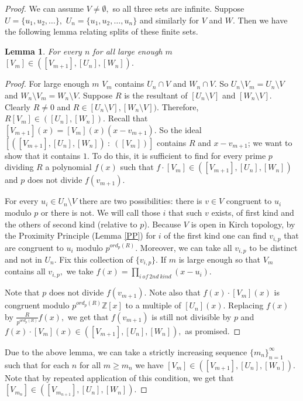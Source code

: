 \documentclass[10pt]{article}
\newtheorem{lemma}[theorem]{Lemma}
\theoremstyle{definition}
\begin{document}
\begin{proof}
We can assume $V \neq \emptyset ,$ so all three sets are infinite. Suppose $U=\{u_1,u_2,\dots \},$ $U_n=\{u_1,u_2,\dots, u_n\}$ and similarly for $V$ and $W$. Then we have the following lemma relating splits of these finite sets.

\begin{lemma} For every $n$ for all large enough $m$ $[V_m] \in ( [V_{m+1}], [U_n], [W_n]).$
\end{lemma}

\begin{proof} For large enough $m$  $V_m$ contains $U_n\cap V$ and $W_n\cap V.$ So $U_n\setminus V_m= U_n\setminus V$ and $W_n\setminus V_m= W_n\setminus V$. Suppose $R$ is the resultant of $[U_n\setminus V]$ and $[W_n\setminus V]$. Clearly $R\neq 0$ and $R\in [U_n\setminus V], [W_n \setminus V]).$ Therefore, $R[V_m] \in ([U_n],[W_n]).$  Recall that $[V_{m+1}](x)=[V_m](x) (x-v_{m+1}).$ So the ideal $[  ( [V_{m+1}], [U_n], [W_n]) \ : \ ([V_m] )]$ contains $R$ and $x-v_{m+1}$; we want to show that it contains $1$. To do this, it is sufficient to find for every prime $p$ dividing $R$ a polynomial $f(x)$ such that $f \cdot [V_m] \in ( [V_{m+1}], [U_n], [W_n])$ and $p$ does not divide $ f(v_{m+1})$.

For every $u_i\in U_n\setminus V$ there are two possibilities: there is $v\in V$ congruent to $u_i$ modulo $p$ or there is not. We will call those $i$ that such $v$ exists, of first kind and the others of second kind (relative to $p$). Because $V$ is open in Kirch topology, by the Proximity Principle (Lemma \ref{PP}) for $i$ of the first kind one can find $v_{i,p}$ that are congruent to $u_i$ modulo $p^{ord_p(R)}.$ Moreover, we can take all $v_{i,p}$ to be distinct and not in $U_n$. Fix this collection of $\{v_{i,p}\}$. If $m$ is large enough so that $V_m$ contains all  $v_{i,p},$ we take $f(x) = \prod \limits_{i\ of\ 2nd\  kind} (x-u_i). $

Note that $p$ does not divide $f(v_{m+1})$. Note also that $f(x)\cdot [V_m](x)$ is congruent modulo $p^{ord_p(R)}\mathbb Z[x]$ to a multiple of $[U_n](x).$ Replacing $f(x)$ by $\frac{R}{p^{ord_p(R)} }f(x),$ we get that $f(v_{m+1})$ is still not divisible by $p$ and $f(x)\cdot [V_m](x) \in ( [V_{m+1}], [U_n], [W_n]),$ as promised.
\end{proof}


Due to the above lemma, we can take a strictly increasing sequence  $\{m_n\}_{n=1}^{\infty}$ such that for each $n$ for all $m\geq m_n$ we have $[V_m]\in ([V_{m+1}],[U_n], [W_n])$. Note that by repeated application of this condition, we get that $[V_{m_n}]\in ([V_{m_{n+1}}],[U_n], [W_n]).$



\end{proof}
\end{document}
